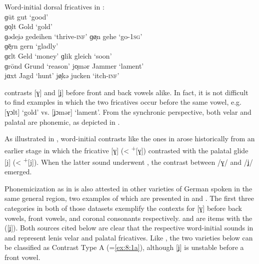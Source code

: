 \ea%
\label{ex:8:10}Word-initial dorsal fricatives in :\\
\ea\label{ex:8:10a}   ɡūt     \tab [ɣuːt]     \tab   gut    \tab ‘good’  \\
      ɡoͅlt   \tab  [ɣɔlt]    \tab    Gold   \tab ‘gold’ \\
      ɡədei̯ə \tab  [ɣədeiə]  \tab    gedeihen \tab ‘thrive\textsc{{}-inf}’ 
\ex\label{ex:8:10b}   ɡøͅn    \tab  [ɣœn]     \tab    gehe  \tab ‘go\textsc{{}-1sg}’ \\
      ɡēͅrn   \tab  [ɣɛːrn]   \tab    gern  \tab ‘gladly’   \\
      ɡɛlt    \tab [ɣælt]     \tab   Geld  \tab ‘money’     
\ex\label{ex:8:10c}   ɡlik    \tab [ɣlik]     \tab   gleich  \tab ‘soon’    \\
      ɡrōnd   \tab [ɣʀoːnt]   \tab   Grund  \tab ‘reason’   
\ex\label{ex:8:10d}   joͅmər  \tab  [ʝɔmər]   \tab    Jammer  \tab ‘lament’ \\
      jɑxt    \tab [ʝɑxt]     \tab   Jagd  \tab ‘hunt’      
\ex\label{ex:8:10e}   jøͅkə   \tab  [ʝœkə]    \tab    jucken  \tab ‘itch\textsc{{}-inf}’ 
 \z
\z 

 contrasts [ɣ] and [ʝ] before front and back vowels alike. In fact, it is not difficult to find examples in which the two fricatives occur before the same vowel, e.g. [ɣɔlt] ‘gold’ vs. [ʝɔmər] ‘lament’. From the synchronic perspective, both velar and palatal are phonemic, as depicted in .

As illustrated in , word-initial contrasts like the ones in  arose historically from an earlier stage in which the fricative [ɣ] (< \textsuperscript{+}[ɣ]) contrasted with the palatal glide [j] (< \textsuperscript{+}[j]). When the latter sound underwent , the contrast between /ɣ/ and /ʝ/ emerged.

Phonemicization as in  is also attested in other varieties of German spoken in the same general region, two examples of which are presented in  and . The first three categories in both of those datasets exemplify the contexts for [ɣ] before back vowels, front vowels, and coronal consonants respectively.  and  are items with the  ([ʝ]). Both sources cited below are clear that the respective word-initial sounds in  and  represent lenis velar and palatal fricatives. Like , the two varieties below can be classified as Contrast Type A (=\ref{ex:8:1a}), although [ʝ] is unstable before a front vowel.

